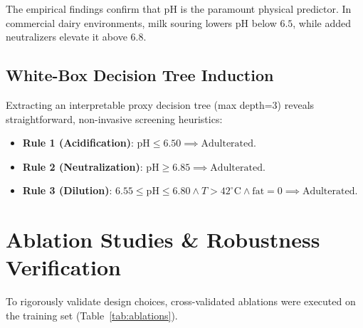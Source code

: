 \documentclass[conference]{IEEEtran}
\begin{document}
The empirical findings confirm that pH is the paramount physical predictor. In commercial dairy environments, milk souring lowers pH below $6.5$, while added neutralizers elevate it above $6.8$.

\subsection{White-Box Decision Tree Induction}
Extracting an interpretable proxy decision tree (max depth=3) reveals straightforward, non-invasive screening heuristics:
\begin{itemize}
    \item \textbf{Rule 1 (Acidification)}: $\text{pH} \le 6.50 \implies \text{Adulterated}$.
    \item \textbf{Rule 2 (Neutralization)}: $\text{pH} \ge 6.85 \implies \text{Adulterated}$.
    \item \textbf{Rule 3 (Dilution)}: $6.55 \le \text{pH} \le 6.80 \land T > 42^\circ\text{C} \land \text{fat} = 0 \implies \text{Adulterated}$.
\end{itemize}

\section{Ablation Studies \& Robustness Verification}
To rigorously validate design choices, cross-validated ablations were executed on the training set (Table~\ref{tab:ablations}).
\end{document}
